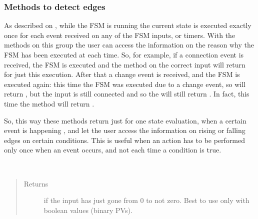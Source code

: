 \documentclass[letterpaper,10pt,english]{sphinxmanual}
\begin{document}
\subsubsection{Methods to detect edges}
\label{\detokenize{io:methods-to-detect-edges}}\label{\detokenize{io:io-edges}}
As described on {\hyperref[\detokenize{fsm:fsm-development}]{}}, while the FSM is running the current
state is executed exactly once for each event received on any of the FSM inputs,
or timers. With the methods on this group the user can access the information on
the reason why the FSM has been executed at each time. So, for example, if a
connection event is received, the FSM is executed and the method
{\hyperref[\detokenize{io:connecting}]{}} on the correct input will return  for just this
execution. After that a change event is received, and the FSM is executed again:
this time the FSM was executed due to a change event, so {\hyperref[\detokenize{io:connecting}]{}}
will return , but the input is still connected and so the
{\hyperref[\detokenize{io:connected}]{}} will still return . In fact, this time the
method {\hyperref[\detokenize{io:changing}]{}} will return .

So, this way these methods return  just for one state evaluation, when a
certain event is happening , and let the user access the information
on rising or falling edges on certain conditions. This is useful when an action
has to be performed only once when an event occurs, and not each time a
condition is true.

\begin{fulllineitems}
\label{\detokenize{io:rising}}~\begin{quote}\begin{description}
\item[{Returns}] \leavevmode
{} if the input has just gone from 0 to not zero. Best to use only with boolean values (binary PVs).

\end{description}\end{quote}

\end{fulllineitems}
\end{document}
